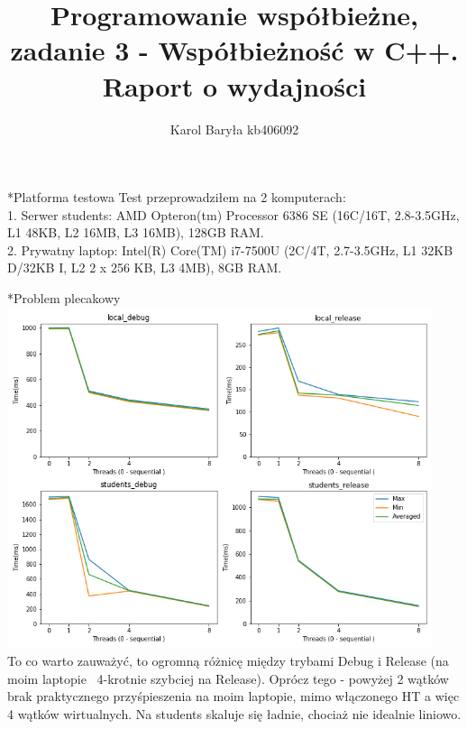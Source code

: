 \documentclass[a4paper,10pt,notitlepage]{report}
\title{Programowanie współbieżne, zadanie 3 - Współbieżność w C++. Raport o wydajności}
\author{Karol Baryła kb406092}
\begin{document}
\date{}

\maketitle
\thispagestyle{empty}



\begin{section}*{Platforma testowa}
Test przeprowadziłem na 2 komputerach:\\
1. Serwer students: AMD Opteron(tm) Processor 6386 SE (16C/16T, 2.8-3.5GHz, L1 48KB, L2 16MB, L3 16MB), 128GB RAM.\\
2. Prywatny laptop: Intel(R) Core(TM) i7-7500U (2C/4T, 2.7-3.5GHz, L1 32KB D/32KB I, L2 2 x 256 KB, L3 4MB), 8GB RAM.\\
\end{section}

\begin{section}*{Problem plecakowy}
\includegraphics[width=12.5cm, height=10cm]{backpack.png}\\
To co warto zauważyć, to ogromną różnicę między trybami Debug i Release (na moim laptopie ~4-krotnie szybciej na Release). Oprócz tego - powyżej 2 wątków brak praktycznego przyśpieszenia na moim laptopie, mimo włączonego HT a więc 4 wątków wirtualnych. Na students skaluje się ładnie, chociaż nie idealnie liniowo.
\end{section}
\end{document}
